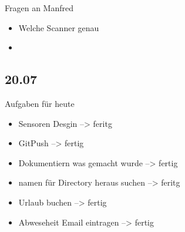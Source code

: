 Fragen an Manfred
\begin{itemize}
\item Welche Scanner genau
\item 
\end{itemize}


\subsection{20.07}

Aufgaben für heute
\begin{itemize}
\item Sensoren Desgin --> feritg
\item GitPush --> fertig
\item Dokumentiern was gemacht wurde --> fertig
\item namen für Directory heraus suchen --> feritg
\item Urlaub buchen --> fertig
\item Abweseheit Email eintragen --> fertig


\end{itemize}
